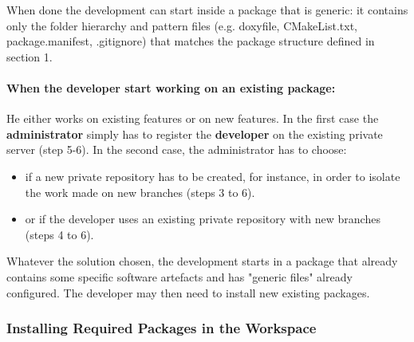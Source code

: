 \documentclass[12pt,a4paper]{article}
\begin{document}
When done the development can start inside a package that is generic: it contains only the folder hierarchy and pattern files (e.g. doxyfile, CMakeList.txt, package.manifest, .gitignore) that matches the package structure defined in section 1.

\paragraph{When the developer start working on an existing package:} 
He either works on existing features or on new features. In the first case the \textbf{administrator} simply has to register the \textbf{developer} on the existing private server (step 5-6). In the second case, the administrator has to choose:
\begin{itemize}
\item if a new private repository has to be created, for instance, in order to isolate the work made on new branches (steps 3 to 6).
\item or if the developer uses an existing private repository with new branches (steps 4 to 6).
\end{itemize}
 
Whatever the solution chosen, the development starts in a package that already  contains some specific software artefacts and has "generic files" already configured. The developer may then need to install new existing packages.

\subsubsection{Installing Required Packages in the Workspace}
\end{document}
